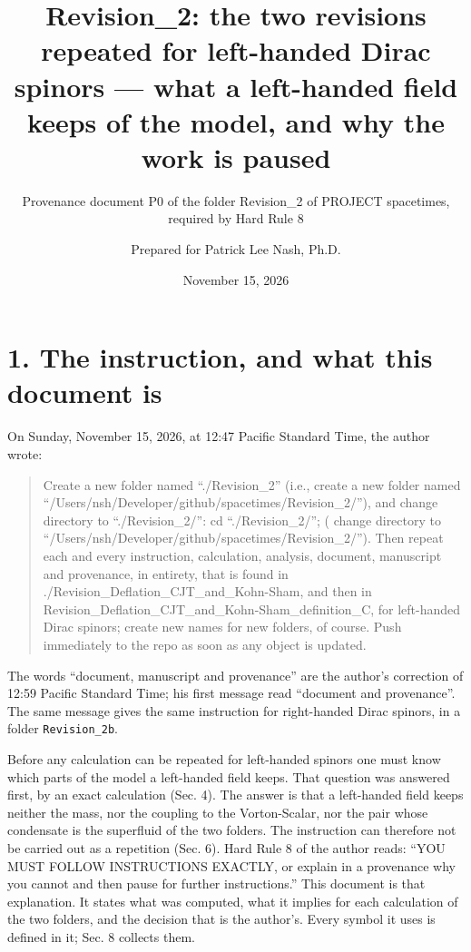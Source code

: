 \documentclass[
  10pt,
]{article}
\title{Revision\_2: the two revisions repeated for left-handed Dirac
spinors --- what a left-handed field keeps of the model, and why the
work is paused}
\subtitle{Provenance document P0 of the folder Revision\_2 of PROJECT
spacetimes, required by Hard Rule 8}
\author{Prepared for Patrick Lee Nash, Ph.D.}
\date{November 15, 2026}
\begin{document}
\maketitle

\hypertarget{the-instruction-and-what-this-document-is}{%
\section{1. The instruction, and what this document
is}\label{the-instruction-and-what-this-document-is}}

On Sunday, November 15, 2026, at 12:47 Pacific Standard Time, the author
wrote:

\begin{quote}
Create a new folder named ``./Revision\_2'' (i.e., create a new folder
named ``/Users/nsh/Developer/github/spacetimes/Revision\_2/''), and
change directory to ``./Revision\_2/'': cd ``./Revision\_2/''; ( change
directory to ``/Users/nsh/Developer/github/spacetimes/Revision\_2/'').
Then repeat each and every instruction, calculation, analysis, document,
manuscript and provenance, in entirety, that is found in
./Revision\_Deflation\_CJT\_and\_Kohn-Sham, and then in
Revision\_Deflation\_CJT\_and\_Kohn-Sham\_definition\_C, for left-handed
Dirac spinors; create new names for new folders, of course. Push
immediately to the repo as soon as any object is updated.
\end{quote}

The words ``document, manuscript and provenance'' are the author's
correction of 12:59 Pacific Standard Time; his first message read
``document and provenance''. The same message gives the same instruction
for right-handed Dirac spinors, in a folder \texttt{Revision\_2b}.

Before any calculation can be repeated for left-handed spinors one must
know which parts of the model a left-handed field keeps. That question
was answered first, by an exact calculation (Sec. 4). The answer is that
a left-handed field keeps neither the mass, nor the coupling to the
Vorton-Scalar, nor the pair whose condensate is the superfluid of the
two folders. The instruction can therefore not be carried out as a
repetition (Sec. 6). Hard Rule 8 of the author reads: ``YOU MUST FOLLOW
INSTRUCTIONS EXACTLY, or explain in a provenance why you cannot and then
pause for further instructions.'' This document is that explanation. It
states what was computed, what it implies for each calculation of the
two folders, and the decision that is the author's. Every symbol it uses
is defined in it; Sec. 8 collects them.
\end{document}
